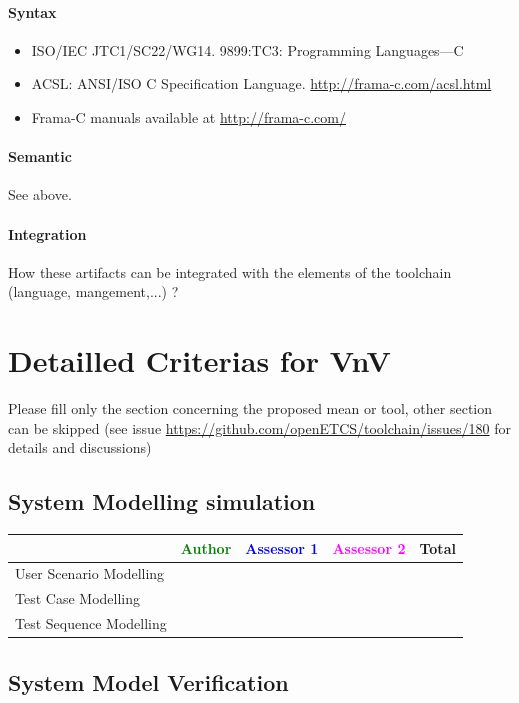 \paragraph{Syntax}
\begin{itemize}
\item ISO/IEC JTC1/SC22/WG14. 9899:TC3: Programming Languages---C
\item ACSL: ANSI/ISO C Specification Language. 
  \url{http://frama-c.com/acsl.html}
\item Frama-C manuals available at \url{http://frama-c.com/}
\end{itemize}
    
\paragraph{Semantic}
See above.


\paragraph{Integration}
    How these artifacts can be integrated with the elements of the toolchain (language, mangement,...) ?


\section{Detailled Criterias for VnV}

Please  fill only the section concerning the proposed mean or tool, other section can be skipped (see issue \url{https://github.com/openETCS/toolchain/issues/180} for details and discussions)



\subsection{System Modelling simulation}	

\begin{tabular}{|l | c | c | c | c|}
\hline
& \textcolor{green}{Author} & \textcolor{blue}{Assessor 1} & \textcolor{magenta}{Assessor 2} & Total \\
\hline 
User Scenario Modelling & & & &  \\
\hline
Test Case Modelling & & & &  \\
\hline
Test Sequence Modelling & & & &  \\
\hline
\end{tabular}
	
\subsection{System Model Verification}	


